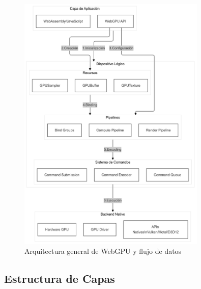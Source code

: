 \begin{figure}[H]
    \centering
    \includegraphics[width=0.8\textwidth]{figuras/webgpu-architecture.png}
    \caption{Arquitectura general de WebGPU y flujo de datos}
    \label{fig:webgpu-architecture}
\end{figure}




\subsection{Estructura de Capas}
\label{subsec:layer-structure}

